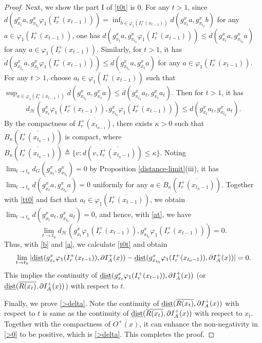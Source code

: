 \documentclass[a4paper,11pt]{article}
\theoremstyle{plain}
\theoremstyle{definition}
\numberwithin{equation}{section}
\begin{document}
\begin{proof}
    Next, we show the part I of \eqref{t0t} is $0$. For any $t>1$, since $d(g_{x_{t}}^{x}a,g_{x_{t_{0}}}^{x}\varphi_1 (I^{+}_{r}(x_{t-1})))=\inf_{b\in \varphi_1 (I^{+}_{r}(x_{t-1}))} d(g_{x_{t}}^{x}a,g_{x_{t_{0}}}^{x}b)$ for any $a\in \varphi_1(I^{+}_{r}(x_{t-1}))$, one has 
    $d(g_{x_{t}}^{x}a,g_{x_{t_{0}}}^{x}\varphi_1 (I^{+}_{r}(x_{t-1})))\leq d(g_{x_{t}}^{x}a,g_{x_{t_{0}}}^{x}a)$ for any $a\in \varphi_1(I^{+}_{r}(x_{t-1}))$. Similarly, for $t>1$, it has 
    $d(g_{x_{t_{0}}}^{x}a,g_{x_{t}}^{x}\varphi_1 (I^{+}_{r}(x_{t-1})))\leq d(g_{x_{t_{0}}}^{x}a,g_{x_{t}}^{x}a)$ for any $a\in \varphi_1(I^{+}_{r}(x_{t-1}))$. For any $t>1$, choose $a_t\in \varphi_1(\overline{I^{+}_{r}(x_{t-1})})$ such that $\sup_{a\in\varphi_1 (I^{+}_{r}(x_{t-1}))}d(g_{x_{t_{0}}}^{x}a,g_{x_{t}}^{x}a)\leq d(g_{x_{t_{0}}}^{x}a_t,g_{x_{t}}^{x}a_t)$. Then for $t>1$, it has
    \begin{equation}\label{at}
    d_{\mathcal{H}}(g_{x_{t}}^{x}\varphi_1 (I^{+}_{r}(x_{t-1})),g_{x_{t_{0}}}^{x}\varphi_1 (I^{+}_{r}(x_{t-1})))\leq d(g_{x_{t}}^{x}a_t,g_{x_{t_{0}}}^{x}a_t).
    \end{equation} 
    By the compactness of $\overline{I^{+}_{r}(x_{t_{0-1}})}$, there exists $\kappa>0$ such that $B_{\kappa}(\overline{I^{+}_{r}(x_{t_0-1})})$ is compact, where $B_{\kappa}(\overline{I^{+}_{r}(x_{t_0-1})})\triangleq\{v: d(v,\overline{I^{+}_{r}(x_{t_0-1})})\leq \kappa\}$. 
    Noting $\lim_{t\rightarrow t_{0}}d_G(g_{x_{t}}^{x},g_{x_{t_{0}}}^{x})=0$ by Proposition \ref{distance-limit}(iii), it has $\lim_{t\rightarrow t_{0}}d(g_{x_{t}}^{x}a,g_{x_{t_{0}}}^{x}a)=0$ uniformly for any $a\in B_{\kappa}(\overline{I^{+}_{r}(x_{t_0-1})})$. Together with \eqref{tt0} and fact that $a_t\in \varphi_1(\overline{I^{+}_{r}(x_{t-1})})$, we obtain $\lim_{t\rightarrow t_{0}}d(g_{x_{t}}^{x}a_t,g_{x_{t_{0}}}^{x}a_t)=0$, and hence, with \eqref{at}, we have
    \begin{equation}\label{a}
        \lim_{t\rightarrow t_{0}}d_{\mathcal{H}}(g_{x_{t}}^{x}\varphi_1 (I^{+}_{r}(x_{t-1})),g_{x_{t_{0}}}^{x}\varphi_1 (I^{+}_{r}(x_{t-1})))=0.
    \end{equation}
    Thus, with \eqref{b} and \eqref{a}, we calculate \eqref{t0t} and obtain
    \begin{equation*}
    \lim_{t\rightarrow t_{0}}|{\rm\underline{dist}}(g_{x_{t}}^{x}\varphi_1 (I^{+}_{r}(x_{t-1})), \partial  I^{+}_{A}(x))-{\rm\underline{dist}}(g_{x_{t_{0}}}^{x}\varphi_1 (I^{+}_{r}(x_{t_{0}-1})), \partial  I^{+}_{A}(x))|=0.
    \end{equation*}
    This implies the continuity of ${\rm\underline{dist}}(g_{x_{t}}^{x}\varphi_1 (I^{+}_{r}(x_{t-1})), \partial  I^{+}_{A}(x))$ (or ${\rm\underline{dist}}(\overline{R(x_t)},\partial  I^{+}_{A}(x))$) with respect to $t$.

    Finally, we prove \eqref{>delta}. Note the continuity of ${\rm\underline{dist}}(\overline{R(x_t)},\partial  I^{+}_{A}(x))$ with respect to $t$ is same as the continuity of ${\rm\underline{dist}}(\overline{R(x_t)},\partial  I^{+}_{A}(x))$ with respect to $x_t$. Together with the compactness of $\overline{O^{+}(x)}$, it can enhance the non-negativity in \eqref{>0} to be positive, which is \eqref{>delta}. This completes the proof.
\end{proof}
\end{document}

